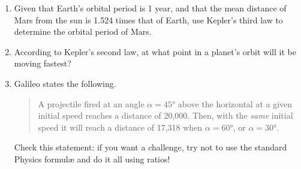 \begin{exercises}{}{}
\begin{enumerate}
  \item%
  Given that Earth's orbital period is 1 year, and that the mean distance of Mars from the sun is 1.524 times that of Earth, use Kepler's third law to determine the orbital period of Mars.
  
  \item%
  According to Kepler's second law, at what point in a planet's orbit will it be moving fastest?
  
  \item%
  Galileo states the following.
  \begin{quote}
  A projectile fired at an angle $\alpha=\ang{45}$ above the horizontal at a given initial speed reaches a distance of 20,000. Then, with the \emph{same} initial speed it will reach a distance of 17,318 when $\alpha=\ang{60}$, or $\alpha=\ang{30}$.
  \end{quote}
  Check this statement: if you want a challenge, try not to use the standard Physics formulæ and do it all using ratios!
\end{enumerate}
\end{exercises}